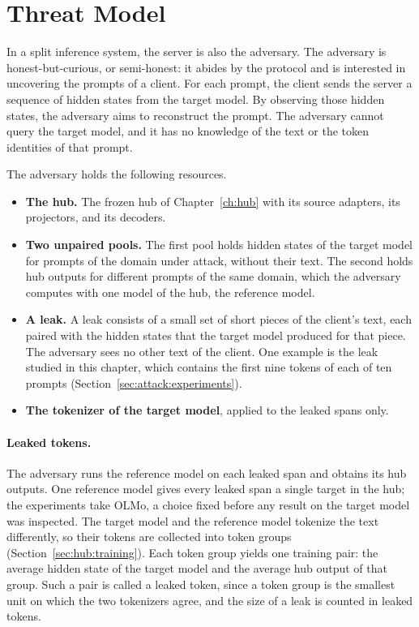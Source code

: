 \section{Threat Model}\label{sec:attack:threat}

In a split inference system, the server is also the adversary.
The adversary is honest-but-curious, or semi-honest: it abides by the protocol and is interested in uncovering the prompts of a client.
For each prompt, the client sends the server a sequence of hidden states from the target model.
By observing those hidden states, the adversary aims to reconstruct the prompt.
The adversary cannot query the target model, and it has no knowledge of the text or the token identities of that prompt.

The adversary holds the following resources.
\begin{itemize}
\item \textbf{The hub.} The frozen hub of Chapter~\ref{ch:hub} with its source adapters, its projectors, and its decoders.
\item \textbf{Two unpaired pools.} The first pool holds hidden states of the target model for prompts of the domain under attack, without their text.
The second holds hub outputs for different prompts of the same domain, which the adversary computes with one model of the hub, the reference model.
\item \textbf{A leak.} A leak consists of a small set of short pieces of the client's text, each paired with the hidden states that the target model produced for that piece.
The adversary sees no other text of the client.
One example is the leak studied in this chapter, which contains the first nine tokens of each of ten prompts (Section~\ref{sec:attack:experiments}).
\item \textbf{The tokenizer of the target model}, applied to the leaked spans only.
\end{itemize}

\paragraph{Leaked tokens.} The adversary runs the reference model on each leaked span and obtains its hub outputs.
One reference model gives every leaked span a single target in the hub; the experiments take OLMo, a choice fixed before any result on the target model was inspected.
The target model and the reference model tokenize the text differently, so their tokens are collected into token groups (Section~\ref{sec:hub:training}).
Each token group yields one training pair: the average hidden state of the target model and the average hub output of that group.
Such a pair is called a leaked token, since a token group is the smallest unit on which the two tokenizers agree, and the size of a leak is counted in leaked tokens.
